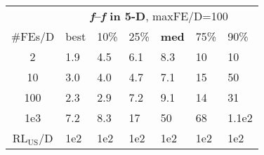 \begin{tabular}{c|llllll}
 & \multicolumn{6}{|c}{\textbf{\textit{f}\raisebox{-0.35ex}{1}--\textit{f}\raisebox{-0.35ex}{24} in 5-D}, maxFE/D=100}\\
\#FEs/D & best & 10\% & 25\% & \textbf{med} & 75\% & 90\%\\
2 & \hspace*{1ex}1.9 & \hspace*{1ex}4.5 & \hspace*{1ex}6.1 & \hspace*{1ex}8.3 & 10 & 10\\
10 & \hspace*{1ex}3.0 & \hspace*{1ex}4.0 & \hspace*{1ex}4.7 & \hspace*{1ex}7.1 & 15 & 50\\
100 & \hspace*{1ex}2.3 & \hspace*{1ex}2.9 & \hspace*{1ex}7.2 & \hspace*{1ex}9.1 & 14 & 31\\
1e3 & \hspace*{1ex}7.2 & \hspace*{1ex}8.3 & 17 & 50 & 68 & 1.1e2\\
$\text{RL}_{\text{US}}$/D & 1e2 & 1e2 & 1e2 & 1e2 & 1e2 & 1e2
\end{tabular}
